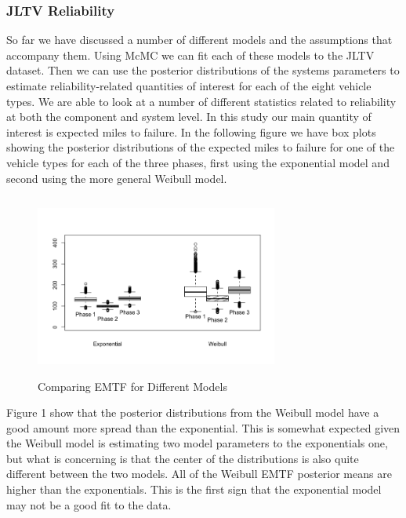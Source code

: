 \documentclass[12pt]{article}
\begin{document}
\subsubsection{JLTV Reliability}
So far we have discussed a number of different models and the assumptions that
accompany them.  Using McMC we can fit each of these models to the JLTV dataset.
Then we can use the posterior distributions of the systems parameters to
estimate reliability-related quantities of interest for each of the eight
vehicle types.  We are able to look at a number of different statistics related
to reliability at both  the component and system level.  In this study our main
quantity of interest is expected miles to  failure.  In the following figure we
have box plots showing the posterior distributions of  the expected miles to
failure for one of the vehicle types for each of the three phases, first using
the exponential model and second using the more general Weibull model.

\begin{figure}
  \centering
      \includegraphics[width=8cm, height=6cm]{Boxplots}
  \caption{Comparing EMTF for Different Models}
\end{figure}

Figure 1 show that the posterior distributions from the Weibull model have a
good amount more spread than the exponential.  This is somewhat expected given
the Weibull model is estimating two model parameters to the exponentials one,
but what is concerning is that the center of the distributions is also quite
different between the two models.  All of the Weibull EMTF posterior means
are higher than the exponentials.  This is the first sign that the exponential
model may not be a good fit to the data.

\pagebreak
\end{document}
